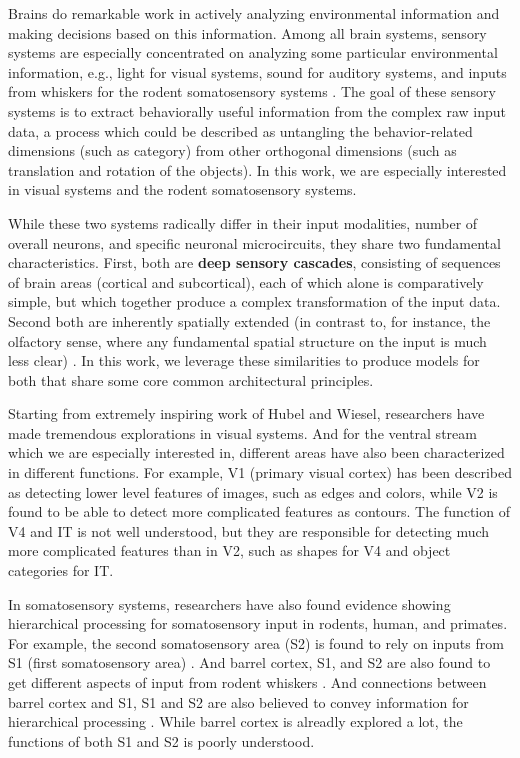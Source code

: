 \documentclass[12pt]{article}
\begin{document}
Brains do remarkable work in actively analyzing environmental information and making decisions based on this information. Among all brain systems, sensory systems are especially concentrated on analyzing some particular environmental information, e.g., light for visual systems, sound for auditory systems, and inputs from whiskers for the rodent somatosensory systems \cite{purves2001neuroscience}.
The goal of these sensory systems is to extract behaviorally useful information from the complex raw input data, a process which could be described as untangling the behavior-related dimensions (such as category) from other orthogonal dimensions (such as translation and rotation of the objects)\cite{yamins2016using}. In this work, we are especially interested in visual systems and the rodent somatosensory systems.

While these two systems radically differ in their input modalities, number of overall neurons, and specific neuronal microcircuits, they share two fundamental characteristics. First, both are \textbf{deep sensory cascades}, consisting of sequences of brain areas (cortical and subcortical), each of which alone is comparatively simple, but which together produce a complex transformation of the input data. Second both are inherently spatially extended (in contrast to, for instance, the olfactory sense, where any fundamental spatial structure on the input is much less clear) \cite{felleman1991distributed}. In this work, we leverage these similarities to produce models for both that share some core common architectural principles.

Starting from extremely inspiring work of Hubel and Wiesel, researchers have made tremendous explorations in visual systems. And for the ventral stream \cite{Goodale1992} which we are especially interested in, different areas have also been characterized in different functions. For example, V1 (primary visual cortex) has been described as detecting lower level features of images, such as edges and colors, while V2 is found to be able to detect more complicated features as contours. The function of V4 and IT is not well understood, but they are responsible for detecting much more complicated features than in V2, such as shapes for V4 and object categories for IT.

In somatosensory systems, researchers have also found evidence showing hierarchical processing for somatosensory input in rodents, human, and primates\cite{Pons1987, Inui2004, Iwamura1998}. For example, the second somatosensory area (S2) is found to rely on inputs from S1 (first somatosensory area) \cite{Pons1987, Petersen2007}. And barrel cortex, S1, and S2 are also found to get different aspects of input from rodent whiskers \cite{Diamond2008}. And connections between barrel cortex and S1, S1 and S2 are also believed to convey information for hierarchical processing \cite{Petersen2007}. While barrel cortex is alreadly explored a lot, the functions of both S1 and S2 is poorly understood.
\end{document}
